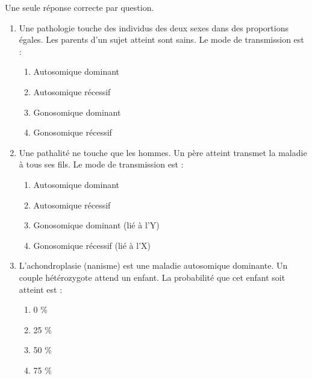 \documentclass[11pt]{article}
\begin{document}
\begin{exercice}
Une seule réponse correcte par question.
\begin{enumerate}
    \item Une pathologie touche des individus des deux sexes dans des proportions égales. Les parents d'un sujet atteint sont sains. Le mode de transmission est :
    \begin{enumerate}
        \item Autosomique dominant
        \item Autosomique récessif
        \item Gonosomique dominant
        \item Gonosomique récessif
    \end{enumerate}
    \item Une pathalité ne touche que les hommes. Un père atteint transmet la maladie à tous ses fils. Le mode de transmission est :
    \begin{enumerate}
        \item Autosomique dominant
        \item Autosomique récessif
        \item Gonosomique dominant (lié à l'Y)
        \item Gonosomique récessif (lié à l'X)
    \end{enumerate}
    \item L'achondroplasie (nanisme) est une maladie autosomique dominante. Un couple hétérozygote attend un enfant. La probabilité que cet enfant soit atteint est :
    \begin{enumerate}
        \item 0 \%
        \item 25 \%
        \item 50 \%
        \item 75 \%
    \end{enumerate}
\end{enumerate}
\end{exercice}
\end{document}
